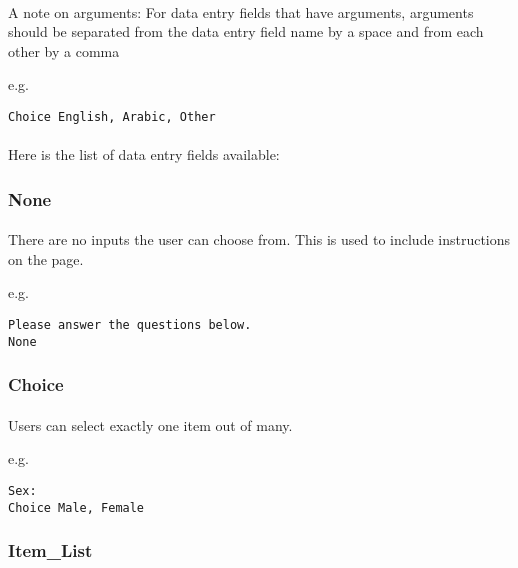 \paragraph{}
A note on arguments: For data entry fields that have arguments, arguments should be separated from the data entry field name by a space and from each other by a comma 

e.g.

\begin{lstlisting}
Choice English, Arabic, Other
\end{lstlisting}

\paragraph{}
Here is the list of data entry fields available:


\subsubsection{None}

\paragraph{}
There are no inputs the user can choose from.  This is used to include instructions on the page.

e.g.

\begin{lstlisting}
Please answer the questions below.
None
\end{lstlisting}


\subsubsection{Choice}

\paragraph{}
Users can select exactly one item out of many.

e.g.

\begin{lstlisting}
Sex:
Choice Male, Female
\end{lstlisting}


\subsubsection{Item\_List}

